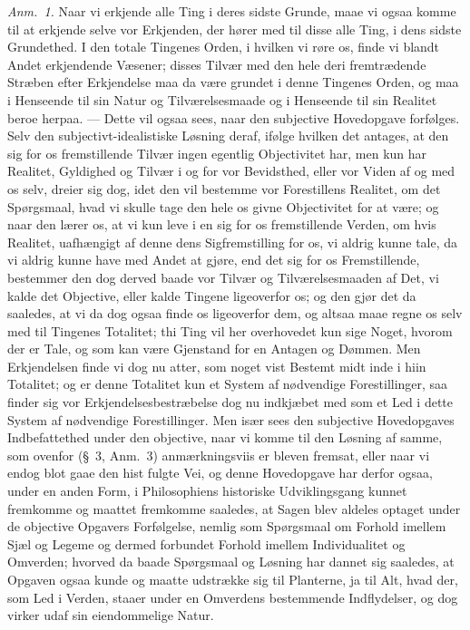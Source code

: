 \documentclass[12pt,a4paper]{book}
\begin{document}
{\small\emph{Anm.~1.} Naar vi erkjende alle Ting i deres sidste Grunde, maae vi
ogsaa komme til at erkjende selve vor Erkjenden, der hører med til disse alle Ting,
i dens sidste Grundethed. I den totale Tingenes Orden, i hvilken vi røre os, finde
vi blandt Andet erkjendende Væsener; disses Tilvær med den hele deri fremtrædende
Stræben efter Erkjendelse maa da være grundet i denne Tingenes Orden, og maa i
Henseende til sin Natur og Tilværelsesmaade og i Henseende til sin Realitet beroe
herpaa. --- Dette vil ogsaa sees, naar den subjective Hovedopgave forfølges. Selv
den subjectivt-idealistiske Løsning deraf, ifølge hvilken det antages, at den sig
for os fremstillende Tilvær ingen egentlig Objectivitet har, men kun har Realitet,
Gyldighed og Tilvær i og for vor Bevidsthed, eller vor Viden af og med os selv,
dreier sig dog, idet den vil bestemme vor Forestillens Realitet, om det
Spørgsmaal, hvad vi skulle tage den hele os givne Objectivitet for at være; og
naar den lærer os, at vi kun leve i en sig for os fremstillende Verden, om hvis
Realitet, uafhængigt af denne dens Sigfremstilling for os, vi aldrig kunne tale,
da vi aldrig kunne have med Andet at gjøre, end det sig for os Fremstillende,
bestemmer den dog derved baade vor Tilvær og Tilværelsesmaaden af Det, vi kalde
det Objective, eller kalde Tingene ligeoverfor os; og den gjør det da saaledes, at
vi da dog ogsaa finde os ligeoverfor dem, og altsaa maae regne os selv med til
Tingenes Totalitet; thi Ting vil her overhovedet kun sige Noget, hvorom der er
Tale, og som kan være Gjenstand for en Antagen og Dømmen. Men Erkjendelsen finde
vi dog nu atter, som noget vist Bestemt midt inde i hiin Totalitet; og er denne
Totalitet kun et System af nødvendige Forestillinger, saa finder sig vor
Erkjendelsesbestræbelse dog nu indkjæbet med som et Led i dette System af
nødvendige Forestillinger. Men især sees den subjective Hovedopgaves
Indbefattethed under den objective, naar vi komme til den Løsning af samme, som
ovenfor (\S~3, Anm.~3) anmærkningsviis er bleven fremsat, eller naar vi endog blot
gaae den hist fulgte Vei, og denne Hovedopgave har derfor ogsaa, under en anden
Form, i Philosophiens historiske Udviklingsgang kunnet fremkomme og maattet
fremkomme saaledes, at Sagen blev aldeles optaget under de objective Opgavers
Forfølgelse, nemlig som Spørgsmaal om Forhold imellem Sjæl og Legeme og dermed
forbundet Forhold imellem Individualitet og Omverden; hvorved da baade Spørgsmaal
og Løsning har dannet sig saaledes, at Opgaven ogsaa kunde og maatte udstrække sig
til Planterne, ja til Alt, hvad der, som Led i Verden, staaer under en Omverdens
bestemmende Indflydelser, og dog virker udaf sin eiendommelige Natur.\par}
\end{document}
